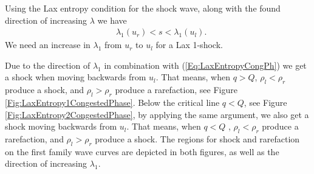 \documentclass[10pt]{article}
\numberwithin{equation}{section}
\begin{document}
Using the Lax entropy condition for the shock wave, along with the found direction of increasing $\lambda$ we have \begin{align}
   &  \lambda_1 (u_r) < s < \lambda_1 (u_l).
   \label{Eq:LaxEntropyCongPh}
\end{align} We need an increase in $\lambda_1 $ from $u_r$ to $u_l$ for a Lax 1-shock.

\begin{figure}
    \centering
    
\end{figure}

Due to the direction of $\lambda_1$ in combination with (\ref{Eq:LaxEntropyCongPh}) we get a shock when moving backwards from $u_l$. That means, when $q > Q$, $\rho_l < \rho_r$ produce a shock, and $\rho_l > \rho_r$ produce a rarefaction, see Figure \ref{Fig:LaxEntropy1CongestedPhase}. Below the critical line $q < Q$, see Figure \ref{Fig:LaxEntropy2CongestedPhase}, by applying the same argument, we also get a shock moving backwards from $u_l$. That means, when $q < Q$ , $\rho_l < \rho_r$ produce a rarefaction, and $\rho_l > \rho_r$ produce a shock. The regions for shock and rarefaction on the first family wave curves are depicted in both figures, as well as the direction of increasing $\lambda_1$. 

\end{document}
